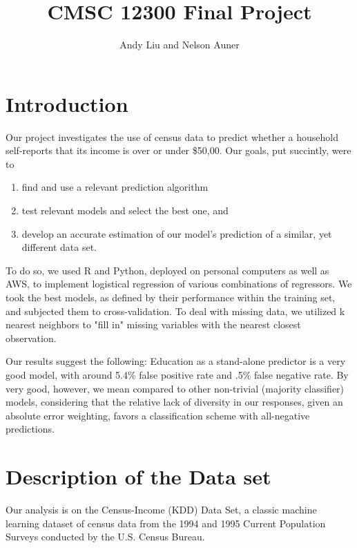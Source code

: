 \documentclass[11pt]{article}
\title{CMSC 12300 Final Project}
\author{Andy Liu and Nelson Auner}
\begin{document}
\maketitle
\section{Introduction}

Our project investigates the use of census data to  predict whether a household self-reports that its income is over or under \$50,00. Our goals, put succintly, were to

\begin{enumerate}
  \item find and use a relevant prediction algorithm 
  \item test relevant models and select the best one, and
  \item develop an accurate estimation of our model's prediction of a similar, yet different data set.
\end{enumerate}
 

To do so, we used R and Python, deployed on personal computers as well as AWS, to implement logistical regression of various combinations of regressors. We took the best models, as defined by their performance within the training set, and subjected them to cross-validation. To deal with missing data, we utilized k nearest neighbors to "fill in" missing variables with the nearest closest observation.

 Our results suggest the following: Education as a stand-alone predictor is a very good model, with around 5.4\% false positive rate and .5\% false negative rate. By very good, however, we mean compared to other non-trivial (majority classifier) models, considering that the relative lack of diversity in our responses, given an absolute error weighting, favors a classification scheme with all-negative predictions. 


\section{Description of the Data set}
Our analysis is on the Census-Income (KDD) Data Set, a classic machine learning dataset of census data from the 1994 and 1995 Current Population Surveys conducted by the U.S. Census Bureau.

\end{document}
